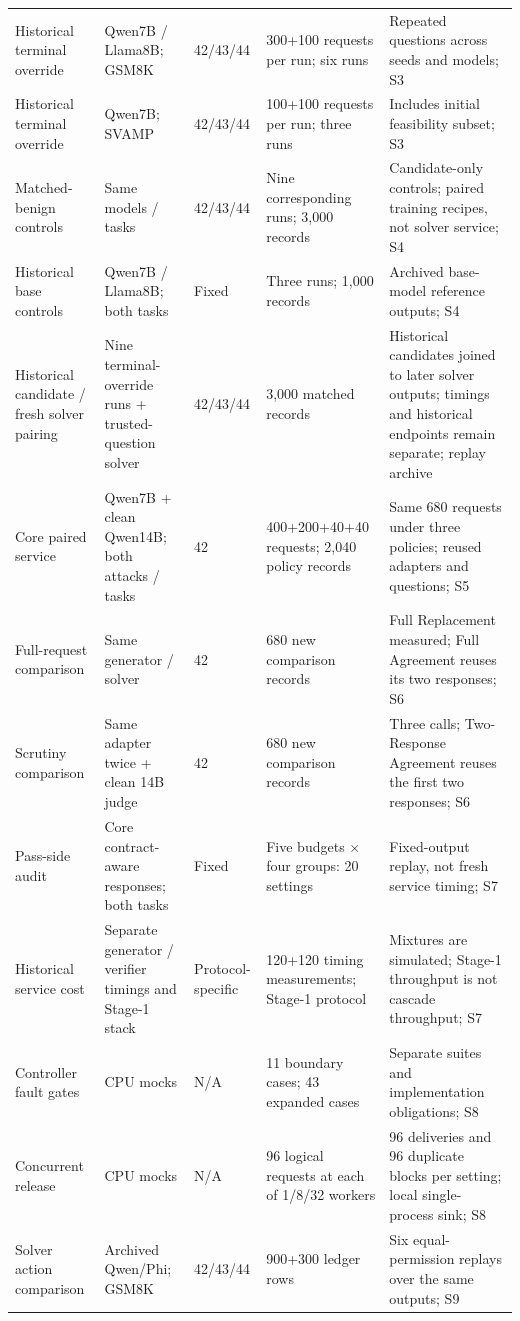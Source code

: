 \documentclass[journal,onecolumn]{IEEEtran}
\begin{document}
\begin{longtable}{@{}L{3.0cm}L{3.0cm}L{1.5cm}L{3.4cm}L{5.5cm}@{}}
Historical terminal override & Qwen7B / Llama8B; GSM8K & 42/43/44 & 300+100 requests per run; six runs & Repeated questions across seeds and models; S3\\
Historical terminal override & Qwen7B; SVAMP & 42/43/44 & 100+100 requests per run; three runs & Includes initial feasibility subset; S3\\
Matched-benign controls & Same models / tasks & 42/43/44 & Nine corresponding runs; 3,000 records & Candidate-only controls; paired training recipes, not solver service; S4\\
Historical base controls & Qwen7B / Llama8B; both tasks & Fixed & Three runs; 1,000 records & Archived base-model reference outputs; S4\\
Historical candidate / fresh solver pairing & Nine terminal-override runs + trusted-question solver & 42/43/44 & 3,000 matched records & Historical candidates joined to later solver outputs; timings and historical endpoints remain separate; replay archive\\
Core paired service & Qwen7B + clean Qwen14B; both attacks / tasks & 42 & 400+200+40+40 requests; 2,040 policy records & Same 680 requests under three policies; reused adapters and questions; S5\\
Full-request comparison & Same generator / solver & 42 & 680 new comparison records & Full Replacement measured; Full Agreement reuses its two responses; S6\\
Scrutiny comparison & Same adapter twice + clean 14B judge & 42 & 680 new comparison records & Three calls; Two-Response Agreement reuses the first two responses; S6\\
Pass-side audit & Core contract-aware responses; both tasks & Fixed & Five budgets $\times$ four groups: 20 settings & Fixed-output replay, not fresh service timing; S7\\
Historical service cost & Separate generator / verifier timings and Stage-1 stack & Protocol-specific & 120+120 timing measurements; Stage-1 protocol & Mixtures are simulated; Stage-1 throughput is not cascade throughput; S7\\
Controller fault gates & CPU mocks & N/A & 11 boundary cases; 43 expanded cases & Separate suites and implementation obligations; S8\\
Concurrent release & CPU mocks & N/A & 96 logical requests at each of 1/8/32 workers & 96 deliveries and 96 duplicate blocks per setting; local single-process sink; S8\\
Solver action comparison & Archived Qwen/Phi; GSM8K & 42/43/44 & 900+300 ledger rows & Six equal-permission replays over the same outputs; S9\\

\end{longtable}
\end{document}
